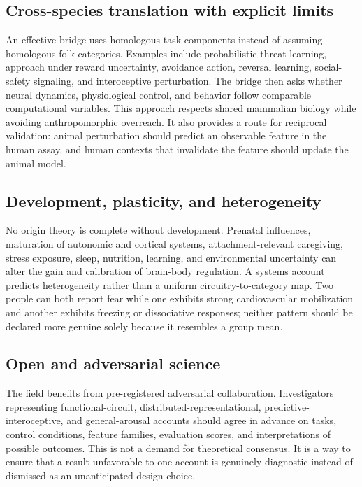 \documentclass[conference]{IEEEtran}
\begin{document}
\subsection{Cross-species translation with explicit limits}

An effective bridge uses homologous task components instead of assuming homologous folk categories. Examples include probabilistic threat learning, approach under reward uncertainty, avoidance action, reversal learning, social-safety signaling, and interoceptive perturbation. The bridge then asks whether neural dynamics, physiological control, and behavior follow comparable computational variables. This approach respects shared mammalian biology while avoiding anthropomorphic overreach. It also provides a route for reciprocal validation: animal perturbation should predict an observable feature in the human assay, and human contexts that invalidate the feature should update the animal model.

\subsection{Development, plasticity, and heterogeneity}

No origin theory is complete without development. Prenatal influences, maturation of autonomic and cortical systems, attachment-relevant caregiving, stress exposure, sleep, nutrition, learning, and environmental uncertainty can alter the gain and calibration of brain-body regulation. A systems account predicts heterogeneity rather than a uniform circuitry-to-category map. Two people can both report fear while one exhibits strong cardiovascular mobilization and another exhibits freezing or dissociative responses; neither pattern should be declared more genuine solely because it resembles a group mean.

\subsection{Open and adversarial science}

The field benefits from pre-registered adversarial collaboration. Investigators representing functional-circuit, distributed-representational, predictive-interoceptive, and general-arousal accounts should agree in advance on tasks, control conditions, feature families, evaluation scores, and interpretations of possible outcomes. This is not a demand for theoretical consensus. It is a way to ensure that a result unfavorable to one account is genuinely diagnostic instead of dismissed as an unanticipated design choice.
\end{document}

